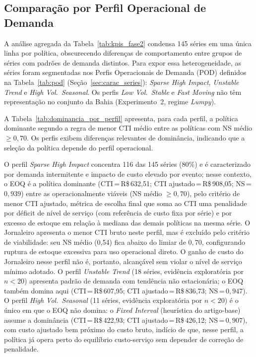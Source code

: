 \subsection{Comparação por Perfil Operacional de Demanda}
\label{sec:comparacao_pod}

A análise agregada da Tabela~\ref{tab:kpis_fase2} condensa 145 séries em uma única linha por política, obscurecendo diferenças de comportamento entre grupos de séries com padrões de demanda distintos. Para expor essa heterogeneidade, as séries foram segmentadas nos Perfis Operacionais de Demanda (POD) definidos na Tabela~\ref{tab:pod} (Seção~\ref{sec:carac_series}): \textit{Sparse High Impact}, \textit{Unstable Trend} e \textit{High Vol.~Seasonal}. Os perfis \textit{Low Vol.~Stable} e \textit{Fast Moving} não têm representação no conjunto da Bahia (Experimento~2, regime \textit{Lumpy}).

A Tabela~\ref{tab:dominancia_por_perfil} apresenta, para cada perfil, a política dominante segundo a regra de menor CTI médio entre as políticas com NS médio $\geq 0{,}70$. Os perfis exibem diferenças relevantes de dominância, indicando que a seleção da política depende do perfil operacional.



O perfil \textit{Sparse High Impact} concentra 116 das 145 séries (80\%) e é caracterizado por demanda intermitente e impacto de custo elevado por evento; nesse contexto, o EOQ é a política dominante (CTI\,=\,R\$\,632,51; CTI ajustado\,=\,R\$\,908,05; NS\,=\,$0{,}939$) entre as operacionalmente viáveis (NS médio $\geq 0{,}70$), pelo critério de menor CTI ajustado, métrica de escolha final que soma ao CTI uma penalidade por déficit de nível de serviço (com referência de custo fixa por série) e por excesso de estoque em relação à mediana das demais políticas na mesma série. O Jornaleiro apresenta o menor CTI bruto neste perfil, mas é excluído pelo critério de viabilidade: seu NS médio (0,54) fica abaixo do limiar de $0{,}70$, configurando ruptura de estoque excessiva para uso operacional direto. O ganho de custo do Jornaleiro nesse perfil não é, portanto, alcançável sem violar o nível de serviço mínimo adotado. O perfil \textit{Unstable Trend} (18 séries, evidência exploratória por $n<20$) apresenta padrão de demanda com tendência não estacionária; o EOQ também domina aqui (CTI\,=\,R\$\,607,95; CTI ajustado\,=\,R\$\,836,73; NS\,=\,$0{,}947$). O perfil \textit{High Vol.~Seasonal} (11 séries, evidência exploratória por $n<20$) é o único em que o EOQ não domina: o \textit{Fixed Interval} (heurística do artigo-base) assume a dominância (CTI\,=\,R\$\,422,93; CTI ajustado\,=\,R\$\,426,12; NS\,=\,$0{,}907$), com custo ajustado bem próximo do custo bruto, indício de que, nesse perfil, a política já opera perto do equilíbrio custo-serviço sem depender de correção de penalidade.

